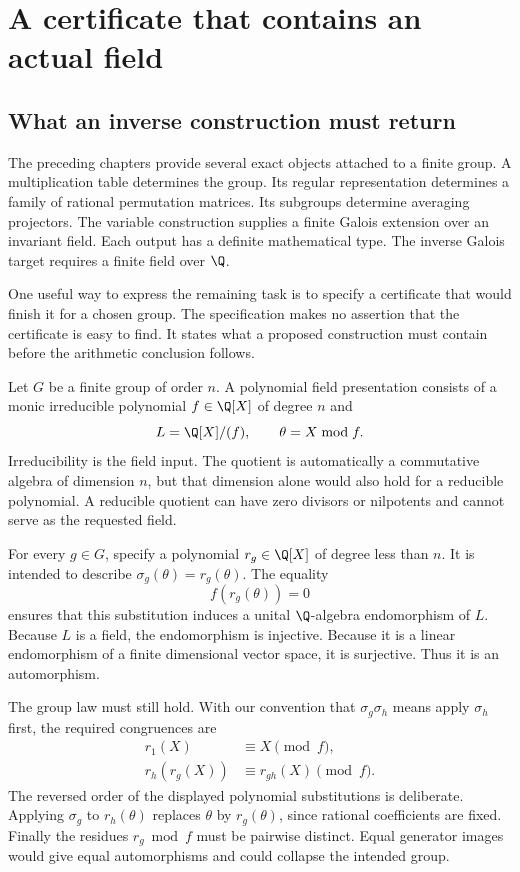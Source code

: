 \chapter{A certificate that contains an actual field}
\label{chap:g07-certificate}

\section{What an inverse construction must return}

The preceding chapters provide several exact objects attached to a finite group. A multiplication table determines the group. Its regular representation determines a family of rational permutation matrices. Its subgroups determine averaging projectors. The variable construction supplies a finite Galois extension over an invariant field. Each output has a definite mathematical type. The inverse Galois target requires a finite field over $\Q$.

One useful way to express the remaining task is to specify a certificate that would finish it for a chosen group. The specification makes no assertion that the certificate is easy to find. It states what a proposed construction must contain before the arithmetic conclusion follows.

Let $G$ be a finite group of order $n$. A polynomial field presentation consists of a monic irreducible polynomial $f\in\Q[X]$ of degree $n$ and
\[
 L=\Q[X]/(f),\qquad \theta=X\bmod f.
\]
Irreducibility is the field input. The quotient is automatically a commutative algebra of dimension $n$, but that dimension alone would also hold for a reducible polynomial. A reducible quotient can have zero divisors or nilpotents and cannot serve as the requested field.

For every $g\in G$, specify a polynomial $r_g\in\Q[X]$ of degree less than $n$. It is intended to describe $\sigma_g(\theta)=r_g(\theta)$. The equality
\[
 f(r_g(\theta))=0
\]
ensures that this substitution induces a unital $\Q$-algebra endomorphism of $L$. Because $L$ is a field, the endomorphism is injective. Because it is a linear endomorphism of a finite dimensional vector space, it is surjective. Thus it is an automorphism.

The group law must still hold. With our convention that $\sigma_g\sigma_h$ means apply $\sigma_h$ first, the required congruences are
\begin{align}
 r_1(X)&\equiv X\pmod f,\label{eq:g07-unit}\\
 r_h(r_g(X))&\equiv r_{gh}(X)\pmod f.\label{eq:g07-composition}
\end{align}
The reversed order of the displayed polynomial substitutions is deliberate. Applying $\sigma_g$ to $r_h(\theta)$ replaces $\theta$ by $r_g(\theta)$, since rational coefficients are fixed. Finally the residues $r_g\bmod f$ must be pairwise distinct. Equal generator images would give equal automorphisms and could collapse the intended group.

